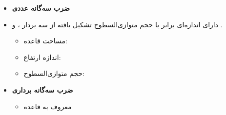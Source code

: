 \begin{ELunit}

\begin{itemize}
\tightlist
\item
  \textbf{ضرب سه‌گانه عددی}
\end{itemize}


\begin{itemize}
\tightlist
\item
  دارای اندازه‌ای برابر با حجم متوازی‌السطوح تشکیل یافته از سه بردار ،  و .

  \begin{itemize}
  \tightlist
  \item
    مساحت قاعده: 
  \item
    اندازه ارتفاع: 
  \item
    حجم متوازی‌السطوح: 
  \end{itemize}
\end{itemize}


\begin{itemize}
\tightlist
\item
  \textbf{ضرب سه‌گانه برداری}

  \begin{itemize}
  \tightlist
  \item
    معروف به قاعده 
  \end{itemize}
\end{itemize}


\end{ELunit}


